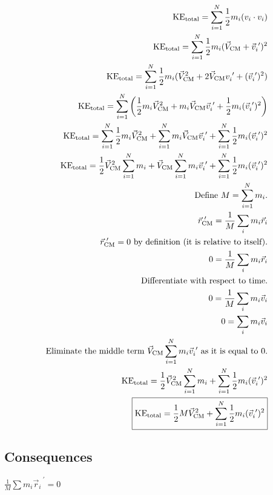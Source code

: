 \documentclass[letterpaper]{article}
\begin{document}
\begin{align*}
\text{KE}_\text{total} = \sum_{i=1}^N \frac{1}{2} m_i (v_i \cdot v_i) \\
\text{KE}_\text{total} =  \sum_{i=1}^N \frac{1}{2} m_i (\vec{V}_\text{CM} + \vec{v}_i^{\text{ }\prime})^2 \\
\text{KE}_\text{total} =  \sum_{i=1}^N \frac{1}{2} m_i (\vec{V}_\text{CM}^2 + 2\vec{V}_\text{CM}{v}_i^{\text{ }\prime} + (\vec{v}_i^{\text{ }\prime})^2) \\
\text{KE}_\text{total} =  \sum_{i=1}^N \left( \frac{1}{2} m_i \vec{V}_\text{CM}^2 + m_i \vec{V}_\text{CM}\vec{v}_i^{\text{ }\prime} + \frac{1}{2} m_i (\vec{v}_i^{\text{ }\prime})^2 \right) \\
\text{KE}_\text{total} =  \sum_{i=1}^N \frac{1}{2} m_i \vec{V}_\text{CM}^2 +  \sum_{i=1}^N  m_i \vec{V}_\text{CM}\vec{v}_i^{\text{ }\prime} + \sum_{i=1}^N \frac{1}{2} m_i  (\vec{v}_i^{\text{ }\prime})^2 \\
\text{KE}_\text{total} =  \frac{1}{2} \vec{V}_\text{CM}^2 \sum_{i=1}^N m_i  + \vec{V}_{\text{CM}} \sum_{i=1}^N  m_i \vec{v}_i^{\text{ }\prime}  + \sum_{i=1}^N \frac{1}{2} m_i  (\vec{v}_i^{\text{ }\prime})^2 \\
\text{Define $M = \sum_{i=1}^N  m_i$.} \\
\vec{r}_\text{CM}^{\text{ }\prime} = \frac{1}{M} \sum_i m_i \vec{r}_i \\
\text{$\vec{r}_\text{CM}^{\text{ }\prime} = 0$ by definition (it is relative to itself).} \\
0 = \frac{1}{M} \sum_i m_i \vec{r}_i \\
\text{Differentiate with respect to time.} \\
0 = \frac{1}{M} \sum_i m_i \vec{v}_i \\
0 = \sum_i m_i \vec{v}_i \\
\text{Eliminate the middle term $ \vec{V}_{\text{CM}} \sum_{i=1}^N  m_i \vec{v}_i^{\text{ }\prime}$ as it is equal to 0.} \\
\text{KE}_\text{total} =  \frac{1}{2} \vec{V}_\text{CM}^2 \sum_{i=1}^N m_i  + \sum_{i=1}^N \frac{1}{2} m_i  (\vec{v}_i^{\text{ }\prime})^2 \\
\boxed{\text{KE}_\text{total} =  \frac{1}{2} M \vec{V}_\text{CM}^2  + \sum_{i=1}^N \frac{1}{2} m_i  (\vec{v}_i^{\text{ }\prime})^2} \\
\end{align*} 



\subsection{Consequences}
\label{sec:org709bb0d}
\(\frac{1}{M} \sum m_i \vec{r}_i^{\text{ }\prime} = 0\)
\end{document}
